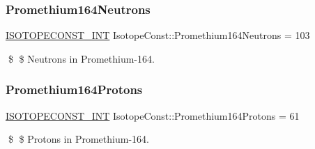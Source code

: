 \subsubsection{\texorpdfstring{Promethium164\+Neutrons}{Promethium164Neutrons}}
{\footnotesize\ttfamily \mbox{\hyperlink{group___isotope_const-_macros_ga5f18360b3e99483a35c32d789e62621c}{I\+S\+O\+T\+O\+P\+E\+C\+O\+N\+S\+T\+\_\+\+I\+NT}} Isotope\+Const\+::\+Promethium164\+Neutrons = 103}

\$ \$ Neutrons in Promethium-\/164. \mbox{\label{group___isotope_const-_promethium-_pm164_ga37ee0f0ed4d51c6d7a18516446dd5798}} 
\subsubsection{\texorpdfstring{Promethium164\+Protons}{Promethium164Protons}}
{\footnotesize\ttfamily \mbox{\hyperlink{group___isotope_const-_macros_ga5f18360b3e99483a35c32d789e62621c}{I\+S\+O\+T\+O\+P\+E\+C\+O\+N\+S\+T\+\_\+\+I\+NT}} Isotope\+Const\+::\+Promethium164\+Protons = 61}

\$ \$ Protons in Promethium-\/164. 